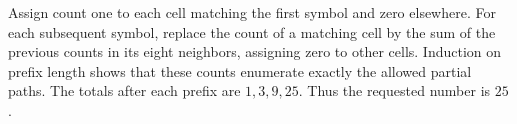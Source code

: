 Assign count one to each cell matching the first symbol and zero elsewhere. For each subsequent symbol, replace the count of a matching cell by the sum of the previous counts in its eight neighbors, assigning zero to other cells. Induction on prefix length shows that these counts enumerate exactly the allowed partial paths. The totals after each prefix are $1,3,9,25$. Thus the requested number is $\boxed{25}$.
